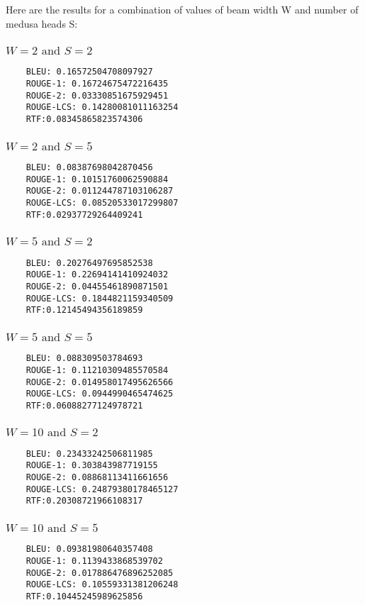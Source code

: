 \documentclass[a4paper,12pt]{article}
\begin{document}
  Here are the results for a combination of values of beam width W and number of medusa heads S:

  \subsubsection{$W = 2 \text{ and } S = 2$}
  \begin{verbatim}
    BLEU: 0.16572504708097927
    ROUGE-1: 0.16724675472216435
    ROUGE-2: 0.03330851675929451
    ROUGE-LCS: 0.14280081011163254
    RTF:0.08345865823574306
    \end{verbatim}

    \subsubsection{$W = 2 \text{ and } S = 5$}
  \begin{verbatim}
    BLEU: 0.08387698042870456
    ROUGE-1: 0.10151760062590884
    ROUGE-2: 0.011244787103106287
    ROUGE-LCS: 0.08520533017299807
    RTF:0.02937729264409241
    \end{verbatim}

    \subsubsection{$W = 5 \text{ and } S = 2$}
  \begin{verbatim}
    BLEU: 0.20276497695852538
    ROUGE-1: 0.22694141410924032
    ROUGE-2: 0.04455461890871501
    ROUGE-LCS: 0.1844821159340509
    RTF:0.12145494356189859
    \end{verbatim}

    \subsubsection{$W = 5 \text{ and } S = 5$}
  \begin{verbatim}
    BLEU: 0.088309503784693
    ROUGE-1: 0.11210309485570584
    ROUGE-2: 0.014958017495626566
    ROUGE-LCS: 0.0944990465474625
    RTF:0.06088277124978721
    \end{verbatim}

    \subsubsection{$W = 10 \text{ and } S = 2$}
  \begin{verbatim}
    BLEU: 0.23433242506811985
    ROUGE-1: 0.303843987719155
    ROUGE-2: 0.08868113411661656
    ROUGE-LCS: 0.24879380178465127
    RTF:0.20308721966108317
    \end{verbatim}

    \subsubsection{$W = 10 \text{ and } S = 5$}
  \begin{verbatim}
    BLEU: 0.09381980640357408
    ROUGE-1: 0.1139433868539702
    ROUGE-2: 0.017886476896252085
    ROUGE-LCS: 0.10559331381206248
    RTF:0.10445245989625856
    \end{verbatim}
\end{document}
